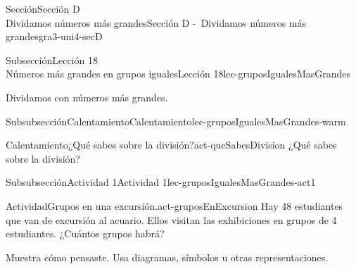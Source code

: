 \begin{sectionptx}{Sección}{{\Large Sección D\\}Dividamos números más grandes}{}{Sección D -~Dividamos números más grandes}{}{}{gra3-uni4-secD}
%
%
\typeout{************************************************}
\typeout{************************************************}
%
\begin{subsectionptx}{Subsección}{{\normalsize Lección 18\\[-0.05cm]}Números más grandes en grupos iguales}{}{Lección 18}{}{}{lec-gruposIgualesMasGrandes}
\begin{introduction}{}%
Dividamos con números más grandes.%
\end{introduction}%
%
%
\typeout{************************************************}
\typeout{************************************************}
%
\begin{subsubsectionptx}{Subsubsección}{Calentamiento}{}{Calentamiento}{}{}{lec-gruposIgualesMasGrandes-warm}
\begin{exploration}{Calentamiento}{¿Qué sabes sobre la división?}{act-queSabesDivision}%
¿Qué sabes sobre la división?%
\end{exploration}%
\end{subsubsectionptx}
%
%
\typeout{************************************************}
\typeout{************************************************}
%
\begin{subsubsectionptx}{Subsubsección}{Actividad 1}{}{Actividad 1}{}{}{lec-gruposIgualesMasGrandes-act1}
\begin{activity}{Actividad}{Grupos en una excursión.}{act-gruposEnExcursion}%
Hay 48 estudiantes que van de excursión al acuario. Ellos visitan las exhibiciones en grupos de 4 estudiantes. ¿Cuántos grupos habrá?%
\par
Muestra cómo pensaste. Usa diagramas, símbolos u otras representaciones.%
\end{activity}%
\end{subsubsectionptx}
%
%
\typeout{************************************************}

\end{subsectionptx}
\end{sectionptx}
